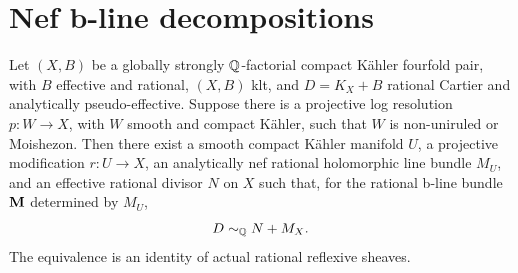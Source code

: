 \section{Nef b-line decompositions}\label{sec:supply}

\begin{proposition}\label{prop:expression}
Let $(X,B)$ be a globally strongly $\mathbb Q$-factorial compact Kähler
fourfold pair, with $B$ effective and rational, $(X,B)$ klt, and
$D=K_X+B$ rational Cartier and analytically pseudo-effective. Suppose
there is a projective log resolution $p:W\to X$, with $W$ smooth and
compact Kähler, such that $W$ is non-uniruled or Moishezon. Then there
exist a smooth compact Kähler manifold $U$, a
projective modification $r:U\to X$, an analytically nef rational
holomorphic line bundle $M_U$, and an effective rational divisor $N$ on
$X$ such that, for the rational b-line bundle $\mathbf M$ determined by $M_U$,
\begin{equation}\label{eq:supply-expression}
 D\sim_{\mathbb Q} N+M_X.
\end{equation}
The equivalence is an identity of actual rational reflexive sheaves.
\end{proposition}

